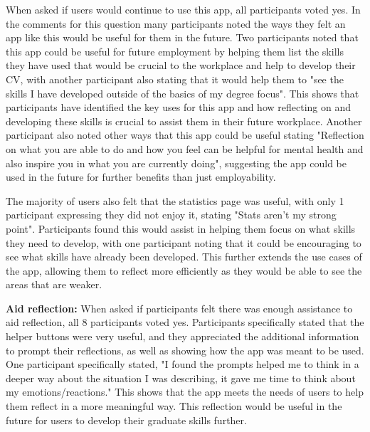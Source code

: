 \documentclass{l4proj}
\begin{document}
When asked if users would continue to use this app, all participants voted yes. In the comments for this question many participants noted the ways they felt an app like this would be useful for them in the future. Two participants noted that this app could be useful for future employment by helping them list the skills they have used that would be crucial to the workplace and help to develop their CV, with another participant also stating that it would help them to "see the skills I have developed outside of the basics of my degree focus". This shows that participants have identified the key uses for this app and how reflecting on and developing these skills is crucial to assist them in their future workplace. Another participant also noted other ways that this app could be useful stating "Reflection on what you are able to do and how you feel can be helpful for mental health and also inspire you in what you are currently doing", suggesting the app could be used in the future for further benefits than just employability.
 
The majority of users also felt that the statistics page was useful, with only 1 participant expressing they did not enjoy it, stating "Stats aren't my strong point". Participants found this would assist in helping them focus on what skills they need to develop, with one participant noting that it could be encouraging to see what skills have already been developed. This further extends the use cases of the app, allowing them to reflect more efficiently as they would be able to see the areas that are weaker. 

\textbf{Aid reflection:} When asked if participants felt there was enough assistance to aid reflection, all 8 participants voted yes. Participants specifically stated that the helper buttons were very useful, and they appreciated the additional information to prompt their reflections, as well as showing how the app was meant to be used. One participant specifically stated, "I found the prompts helped me to think in a deeper way about the situation I was describing, it gave me time to think about my emotions/reactions." This shows that the app meets the needs of users to help them reflect in a more meaningful way. This reflection would be useful in the future for users to develop their graduate skills further.
\end{document}
